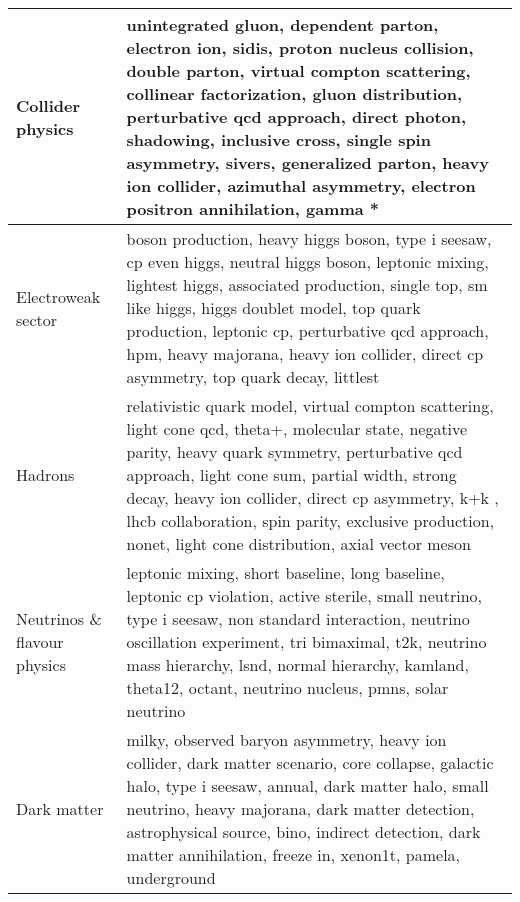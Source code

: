 \begin{longtable}{b{}|b{}}
\bottomrule
\endlastfoot
            Collider physics & unintegrated gluon, dependent parton, electron ion, sidis, proton nucleus collision, double parton, virtual compton scattering, collinear factorization, gluon distribution, perturbative qcd approach, direct photon, shadowing, inclusive cross, single spin asymmetry, sivers, generalized parton, heavy ion collider, azimuthal asymmetry, electron positron annihilation, gamma * \\ \hline
          Electroweak sector &                                  boson production, heavy higgs boson, type i seesaw, cp even higgs, neutral higgs boson, leptonic mixing, lightest higgs, associated production, single top, sm like higgs, higgs doublet model, top quark production, leptonic cp, perturbative qcd approach, hpm, heavy majorana, heavy ion collider, direct cp asymmetry, top quark decay, littlest \\ \hline
                     Hadrons &                 relativistic quark model, virtual compton scattering, light cone qcd, theta+, molecular state, negative parity, heavy quark symmetry, perturbative qcd approach, light cone sum, partial width, strong decay, heavy ion collider, direct cp asymmetry, k+k , lhcb collaboration, spin parity, exclusive production, nonet, light cone distribution, axial vector meson \\ \hline
Neutrinos \& flavour physics &                                                                 leptonic mixing, short baseline, long baseline, leptonic cp violation, active sterile, small neutrino, type i seesaw, non standard interaction, neutrino oscillation experiment, tri bimaximal, t2k, neutrino mass hierarchy, lsnd, normal hierarchy, kamland, theta12, octant, neutrino nucleus, pmns, solar neutrino \\ \hline
                 Dark matter &                                                            milky, observed baryon asymmetry, heavy ion collider, dark matter scenario, core collapse, galactic halo, type i seesaw, annual, dark matter halo, small neutrino, heavy majorana, dark matter detection, astrophysical source, bino, indirect detection, dark matter annihilation, freeze in, xenon1t, pamela, underground \\ \hline
\end{longtable}
